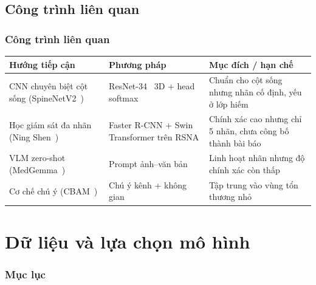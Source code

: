\documentclass{beamer}
\numberwithin{figure}{section}
\numberwithin{table}{section}
\begin{document}
\subsection{Công trình liên quan}
\begin{frame}
\frametitle{Công trình liên quan}
\begin{table}
\centering
\footnotesize
\renewcommand{\arraystretch}{1.25}
\begin{tabular}{@{}p{3.0cm}p{3.2cm}p{3.7cm}@{}}
\toprule
\textbf{Hướng tiếp cận} & \textbf{Phương pháp} & \textbf{Mục đích / hạn chế} \\
\midrule
CNN chuyên biệt cột sống (SpineNetV2~\cite{windsor2022spinenetv2}) & ResNet-34~\cite{he2016resnet} 3D + head softmax & Chuẩn cho cột sống nhưng nhãn cố định, yếu ở lớp hiếm \\
Học giám sát đa nhãn (Ning Shen~\cite{nshen7_rsna2024}) & Faster R-CNN + Swin Transformer trên RSNA & Chính xác cao nhưng chỉ 5 nhãn, chưa công bố thành bài báo \\
VLM zero-shot (MedGemma~\cite{google2025medgemma}) & Prompt ảnh--văn bản & Linh hoạt nhãn nhưng độ chính xác còn thấp \\
Cơ chế chú ý (CBAM~\cite{woo2018cbam}) & Chú ý kênh + không gian & Tập trung vào vùng tổn thương nhỏ \\
\bottomrule
\end{tabular}
\end{table}
\end{frame}

\section{Dữ liệu và lựa chọn mô hình}
{
    \begin{frame}[t]
        \frametitle{Mục lục}
    \end{frame}
}
\end{document}
